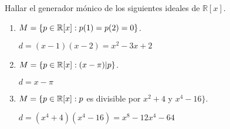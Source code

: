\item Hallar el generador mónico de los siguientes ideales de $\mathbb{R}[x]$.
    \begin{enumerate}
        \item $M=\{p\in\mathbb{R}[x]:p(1)=p(2)=0\}$.
            \begin{mdframed}[style=s]
                \begin{center}
                    $d=(x-1)(x-2)=x^2-3x+2$
                \end{center}
            \end{mdframed}
        \item $M=\{p\in\mathbb{R}[x]:(x-\pi)|p\}$.
            \begin{mdframed}[style=s]
                \begin{center}
                    $d=x-\pi$
                \end{center}
            \end{mdframed}
        \item $M=\{p\in\mathbb{R}[x]: p$ es divisible por $x^2+4$ y $x^4-16\}$.
            \begin{mdframed}[style=s]
                \begin{center}
                    $d=(x^4+4)(x^4-16)=x^8-12x^4-64$
                \end{center}
            \end{mdframed}
    \end{enumerate}